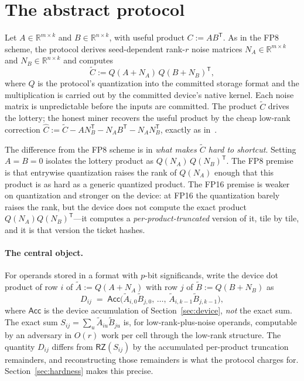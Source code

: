 \documentclass[11pt]{article}
\newcommand{\RZ}{\textsf{RZ}}
\newcommand{\Ct}{\widetilde{C}}
\newcommand{\At}{\widetilde{A}}
\newcommand{\Bt}{\widetilde{B}}
\newcommand{\T}{\mathsf{T}}
\newcommand{\R}{\mathbb{R}}
\newcommand{\FP}[1]{\textsf{FP#1}}
\begin{document}
\section{The abstract protocol}\label{sec:abstract}

Let $A\in\R^{m\times k}$ and $B\in\R^{n\times k}$, with useful product $C:=AB^\T$. As in the
\FP{8} scheme, the protocol derives seed-dependent rank-$r$ noise matrices $N_A\in\R^{m\times k}$
and $N_B\in\R^{n\times k}$ and computes
\begin{equation}
\Ct := Q(A+N_A)\,Q(B+N_B)^\T,
\end{equation}
where $Q$ is the protocol's quantization into the committed storage format and the
multiplication is carried out by the committed device's native kernel. Each noise matrix is
unpredictable before the inputs are committed. The product $\Ct$ drives the lottery; the honest
miner recovers the useful product by the cheap low-rank correction
$\widehat C := \Ct - A N_B^\T - N_A B^\T - N_A N_B^\T$, exactly as in~\cite{KW25,PearlFP8}.

The difference from the \FP{8} scheme is in \emph{what makes $\Ct$ hard to shortcut}. Setting
$A=B=0$ isolates the lottery product as $Q(N_A)\,Q(N_B)^\T$. The \FP{8} premise is that
entrywise quantization raises the rank of $Q(N_A)$ enough that this product is as hard as a
generic quantized product. The \FP{16} premise is weaker on quantization and stronger on the
device: at \FP{16} the quantization barely raises the rank, but the device does not compute the
exact product $Q(N_A)Q(N_B)^\T$---it computes a \emph{per-product-truncated} version of it,
tile by tile, and it is that version the ticket hashes.

\paragraph{The central object.} For operands stored in a format with $p$-bit significands, write
the device dot product of row $i$ of $\At:=Q(A+N_A)$ with row $j$ of $\Bt:=Q(B+N_B)$ as
\begin{equation}\label{eq:dotdevice}
D_{ij} \;=\; \textsf{Acc}\big(\At_{i,0}\Bt_{j,0},\,\dots,\,\At_{i,k-1}\Bt_{j,k-1}\big),
\end{equation}
where $\textsf{Acc}$ is the device accumulation of Section~\ref{sec:device}, \emph{not} the
exact sum. The exact sum $S_{ij}=\sum_u \At_{iu}\Bt_{ju}$ is, for low-rank-plus-noise operands,
computable by an adversary in $O(r)$ work per cell through the low-rank structure. The quantity
$D_{ij}$ differs from $\RZ(S_{ij})$ by the accumulated per-product truncation remainders, and
reconstructing those remainders is what the protocol charges for. Section~\ref{sec:hardness}
makes this precise.
\end{document}
